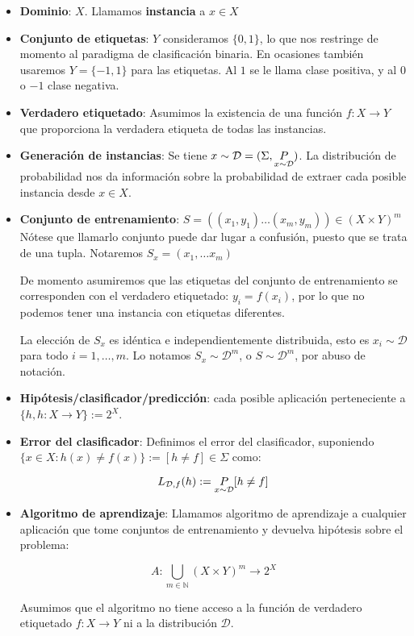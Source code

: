 \begin{itemize}
\item \textbf{Dominio}: $X$. Llamamos \textbf{instancia} a $x\in X$

\item \textbf{Conjunto de etiquetas}: $Y$ consideramos $\{0,1\}$, lo que nos restringe de momento al paradigma de clasificación binaria. 
En ocasiones también usaremos $Y = \{-1,1\}$ para las etiquetas. Al $1$ se le llama clase positiva, y al $0$ o $-1$ clase negativa.

\item \textbf{Verdadero etiquetado}: \sloppy Asumimos la existencia de una función ${f: X \rightarrow Y}$ 
que proporciona la verdadera etiqueta de todas las instancias.

\item \textbf{Generación de instancias}: \fussy Se tiene $x\sim \mathcal{D} = (\Sigma, \underset{x\sim \mathcal{D}}{P})$. La distribución de probabilidad nos da 
información sobre la probabilidad de extraer cada posible instancia desde  $x \in X$. 

\item \textbf{Conjunto de entrenamiento}: $S = ((x_1,y_1) \ldots (x_m,y_m)) \in (X \times Y)^m$ 
Nótese que llamarlo conjunto puede dar lugar a confusión, puesto que se trata de una tupla. Notaremos 
$S_x = (x_1, \ldots x_m)$

De momento asumiremos que las etiquetas del conjunto de entrenamiento se corresponden con el verdadero etiquetado: 
$y_i = f(x_i)$, por lo que no podemos tener una instancia con etiquetas diferentes.

La elección de $S_x$ es idéntica e independientemente distribuida, esto es $x_i \sim \mathcal{D}$ para todo $i=1, \ldots, m$.
Lo notamos $S_x \sim \mathcal{D}^m$, o $S \sim \mathcal{D}^m$, por abuso de notación.

\item \textbf{Hipótesis/clasificador/predicción}: cada posible aplicación perteneciente a 
$\{h, h:X \rightarrow Y\} := 2^{X}$. 

\item \textbf{Error del clasificador}: Definimos el error del clasificador, suponiendo 
$\{x\in X : h(x) \neq f(x)\} := [h\neq f] \in \Sigma$ como:

\[L_{\mathcal{D},f}(h) :=  \underset{x\sim \mathcal{D}}{P} [h \neq f]\]

\item \textbf{Algoritmo de aprendizaje}: Llamamos algoritmo de aprendizaje a cualquier aplicación que tome conjuntos de 
entrenamiento y devuelva hipótesis sobre el problema:

\[A: \underset{m\in \mathbb{N}}{\bigcup} (X\times Y)^m \rightarrow 2^{X}\]

Asumimos que el algoritmo no tiene acceso a la función de verdadero etiquetado $f: X \rightarrow Y$ ni a
la distribución $\mathcal{D}$.
\end{itemize}

